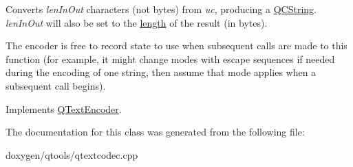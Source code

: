 Converts {\itshape len\+In\+Out} characters (not bytes) from {\itshape uc}, producing a \mbox{\hyperlink{class_q_c_string}{Q\+C\+String}}. {\itshape len\+In\+Out} will also be set to the \mbox{\hyperlink{class_q_c_string_ac52596733e9110b778019946d73fb268}{length}} of the result (in bytes).

The encoder is free to record state to use when subsequent calls are made to this function (for example, it might change modes with escape sequences if needed during the encoding of one string, then assume that mode applies when a subsequent call begins). 

Implements \mbox{\hyperlink{class_q_text_encoder_a3b199427ee9b7f862fe65811165dbbfa}{Q\+Text\+Encoder}}.



The documentation for this class was generated from the following file\+:\begin{DoxyCompactItemize}
\item 
doxygen/qtools/qtextcodec.\+cpp\end{DoxyCompactItemize}
